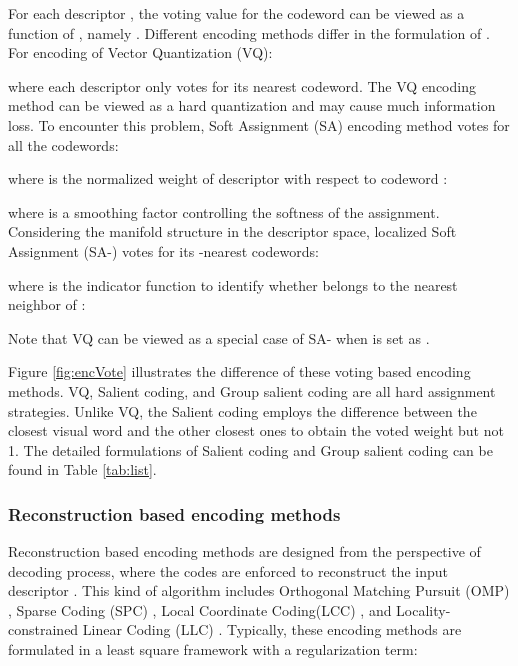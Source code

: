 \documentclass[twocolumn]{svjour3}          \smartqed  \usepackage{slashbox}
\begin{document}
\begin{figure*}[htb]
  \centering
  \subfigure[VQ]{\texttt{[image: vq]}}
  \subfigure[SA]{\texttt{[image: sa]}}
  \subfigure[SA-]{\texttt{[image: sa-k]}}
  \caption{Comparison among all the voting based encoding methods.}
  \label{fig:encVote}
\end{figure*}

For each descriptor , the voting value for the codeword  can be viewed as a function of , namely . Different encoding methods differ in the formulation of . For encoding of Vector Quantization (VQ):

where each descriptor  only votes for its nearest codeword. The VQ encoding method can be viewed as a hard quantization and may cause much information loss. To encounter this problem, Soft Assignment (SA) encoding method votes for all the codewords:

where  is the normalized weight of descriptor  with respect to codeword :

where  is a smoothing factor controlling the softness of the assignment. Considering the manifold structure in the descriptor space, localized Soft Assignment (SA-) votes for its -nearest codewords:

where  is the indicator function to identify whether  belongs to the  nearest neighbor of :

Note that VQ can be viewed as a special case of SA- when  is set as .

Figure \ref{fig:encVote} illustrates the difference of these voting based encoding methods. VQ, Salient coding, and Group salient coding are all hard assignment strategies. Unlike VQ, the Salient coding employs the difference between the closest visual word and the other  closest ones to obtain the voted weight but not 1. The detailed formulations of Salient coding and Group salient coding can be found in Table \ref{tab:list}.

\subsubsection{Reconstruction based encoding methods}
Reconstruction based encoding methods \cite{YangYGH09,WangYYLHG10,YuZG09,TroppG07} are designed from the perspective of decoding process, where the codes  are enforced to reconstruct the input descriptor . This kind of algorithm includes Orthogonal Matching Pursuit (OMP) \cite{TroppG07}, Sparse Coding (SPC) \cite{YangYGH09}, Local Coordinate Coding(LCC) \cite{YuZG09}, and Locality-constrained Linear Coding (LLC) \cite{WangYYLHG10}. Typically, these encoding methods are formulated in a least square framework with a regularization term:
\end{document}
